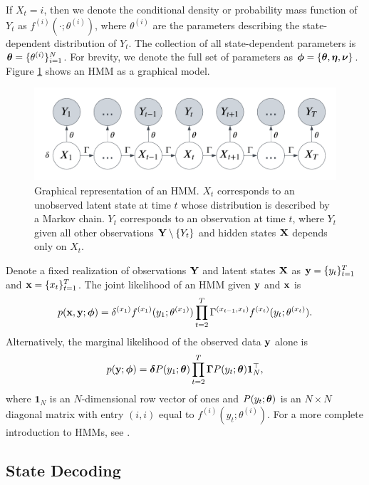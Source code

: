 If $X_t=i$, then we denote the conditional density or probability mass function of $Y_t$ as $f^{(i)}(\cdot ; \theta^{(i)})$, where $\theta^{(i)}$ are the parameters describing the state-dependent distribution of $Y_t$. The collection of all state-dependent parameters is $\boldsymbol{\theta} = \{\theta^{(i)}\}_{i=1}^N$. For brevity, we denote the full set of parameters as $\boldsymbol{\phi} = \{\boldsymbol{\theta},\boldsymbol{\eta},\boldsymbol{\nu}\}$. Figure \ref{fig:HMM} shows an HMM as a graphical model.

\begin{figure}
    \centering
    \includegraphics[width=5in]{../plt/HMM.png}
    \caption{Graphical representation of an HMM. $X_t$ corresponds to an unobserved latent state at time $t$ whose distribution is described by a Markov chain. $Y_t$ corresponds to an observation at time $t$, where $Y_t$ given all other observations $\mathbf{Y} \setminus \{Y_t\}$ and hidden states $\mathbf{X}$ depends only on $X_t$.}
    \label{fig:HMM}
\end{figure}

Denote a fixed realization of observations $\mathbf{Y}$ and latent states $\mathbf{X}$ as $\mathbf{y} = \{y_t\}_{t=1}^T$ and $\mathbf{x} = \{x_t\}_{t=1}^T$. The joint likelihood of an HMM given $\mathbf{y}$ and $\mathbf{x}$ is
%
\begin{equation}
    p(\mathbf{x},\mathbf{y};\boldsymbol{\phi}) = \delta^{(x_1)} f^{(x_1)}(y_1; \theta^{(x_1)}) \prod_{t=2}^T \Gamma^{(x_{t-1},x_t)} f^{(x_t)}(y_t; \theta^{(x_t)}).
    \label{eqn:like}
\end{equation}
%
Alternatively, the marginal likelihood of the observed data $\mathbf{y}$ alone is 
%
\begin{equation}
    p(\mathbf{y};\boldsymbol{\phi}) = \boldsymbol{\delta} P(y_1;\boldsymbol{\theta}) \prod_{t=2}^T \boldsymbol{\Gamma} P(y_t;\boldsymbol{\theta}) \mathbf{1}^\top_N,
    \label{eqn:like_marginal}
\end{equation}
%
where $\mathbf{1}_N$ is an $N$-dimensional row vector of ones and $P(y_t;\boldsymbol{\theta})$ is an $N \times N$ diagonal matrix with entry $(i,i)$ equal to $f^{(i)}(y_t; \theta^{(i)})$. For a more complete introduction to HMMs, see \citet{Zucchini:2016}.
%
\subsection{State Decoding}

